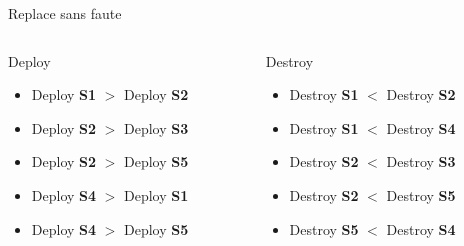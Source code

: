 \documentclass[aspectratio=169,10pt]{beamer}
\begin{document}
\begin{frame}{Replace sans faute}
\vspace{-0.5cm}
    \begin{center}
     
    \end{center}

\begin{columns}[T,onlytextwidth]
    \begin{column}{.45\linewidth}
      \begin{alertblock}{Deploy}
        \begin{itemize}
            \item Deploy {\bf S1} $>$ Deploy {\bf S2}
            \item Deploy {\bf S2} $>$ Deploy {\bf S3}
            \item Deploy {\bf S2} $>$ Deploy {\bf S5}
            \item Deploy {\bf S4} $>$ Deploy {\bf S1}
            \item Deploy {\bf S4} $>$ Deploy {\bf S5}
        \end{itemize}
      \end{alertblock}
    \end{column}
    \begin{column}{.45\linewidth}
    
      \begin{alertblock}{Destroy}
        \begin{itemize}
            \item Destroy {\bf S1} $<$ Destroy {\bf S2}
            \item Destroy {\bf S1} $<$ Destroy {\bf S4}
            \item Destroy {\bf S2} $<$ Destroy {\bf S3}
            \item Destroy {\bf S2} $<$ Destroy {\bf S5}
            \item Destroy {\bf S5} $<$ Destroy {\bf S4}
        \end{itemize}
      \end{alertblock}
    \end{column}
  \end{columns}

\end{frame}

\end{document}
